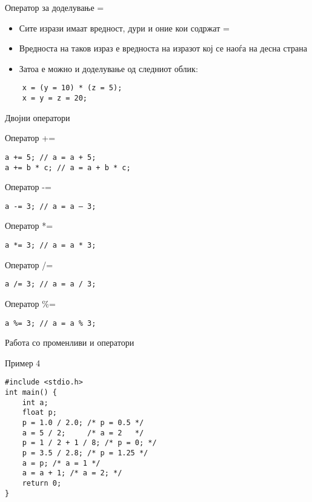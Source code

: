 \begin{frame}[fragile]{Оператор за доделување =}
\begin{itemize}
\item Сите изрази имаат вредност, дури и оние кои содржат =
\item Вредноста на таков израз е вредноста на изразот кој се наоѓа на десна страна
\item Затоа е можно и доделување од следниот облик:
\end{itemize}
\begin{verbatim}
    x = (y = 10) * (z = 5);
    x = y = z = 20;
\end{verbatim}
\end{frame} 

\begin{frame}[fragile,shrink=5]{Двојни оператори}
\begin{block}{Оператор +=}
\begin{verbatim}
a += 5; // a = a + 5;
a += b * c; // a = a + b * c;
\end{verbatim}
\end{block}
\begin{block}{Оператор -=}
\begin{verbatim}
a -= 3; // a = a – 3;
\end{verbatim}
\end{block}
\begin{block}{Оператор *=}
\begin{verbatim}
a *= 3; // a = a * 3;
\end{verbatim}
\end{block}
\begin{block}{Оператор /=}
\begin{verbatim}
a /= 3; // a = a / 3;
\end{verbatim}
\end{block}
\begin{block}{Оператор \%=}
\begin{verbatim}
a %= 3; // a = a % 3;
\end{verbatim}
\end{block}
\end{frame} 

\begin{frame}[fragile]{Работа со променливи и оператори}
    \begin{exampleblock}{Пример 4}
\begin{lstlisting}
#include <stdio.h>  
int main() {
    int a;
    float p;
    p = 1.0 / 2.0; /* p = 0.5 */
    a = 5 / 2;     /* a = 2   */
    p = 1 / 2 + 1 / 8; /* p = 0; */
    p = 3.5 / 2.8; /* p = 1.25 */
    a = p; /* a = 1 */
    a = a + 1; /* a = 2; */
    return 0;       
}
\end{lstlisting}
    \end{exampleblock}
\end{frame}

